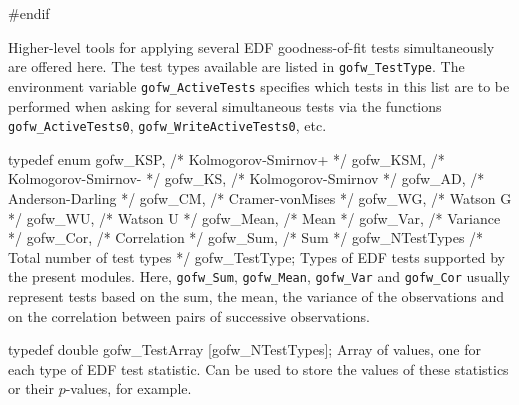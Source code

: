 #endif
\endcode

\fi %



Higher-level tools for applying several EDF goodness-of-fit tests
simultaneously are offered here.
The test types available are listed in {\tt gofw\_TestType}.
The environment variable {\tt gofw\_ActiveTests} specifies which
tests in this list are to be performed when asking for several 
simultaneous tests via the functions {\tt gofw\_ActiveTests0}, 
{\tt gofw\_WriteActiveTests0}, etc.


\code

typedef enum {
   gofw_KSP,                      /* Kolmogorov-Smirnov+        */
   gofw_KSM,                      /* Kolmogorov-Smirnov-        */
   gofw_KS,                       /* Kolmogorov-Smirnov         */
   gofw_AD,                       /* Anderson-Darling           */
   gofw_CM,                       /* Cramer-vonMises            */
   gofw_WG,                       /* Watson G                   */
   gofw_WU,                       /* Watson U                   */
   gofw_Mean,                     /* Mean                       */
   gofw_Var,                      /* Variance                   */
   gofw_Cor,                      /* Correlation                */
   gofw_Sum,                      /* Sum                        */
   gofw_NTestTypes                /* Total number of test types */
   } gofw_TestType;
\endcode
 \tab  Types of EDF tests supported by the present modules.
  Here,  {\tt gofw\_Sum}, {\tt gofw\_Mean}, {\tt gofw\_Var} and {\tt gofw\_Cor}
  usually represent tests based on the sum, the mean, the variance of the 
 observations and on the correlation between pairs of successive observations.
 \endtab
\code


typedef double gofw_TestArray [gofw_NTestTypes];
\endcode
 \tab Array of values, one for each type of EDF test statistic.
  Can be used to store the values of these statistics or their
  $p$-values, for example.
 \endtab
\code


